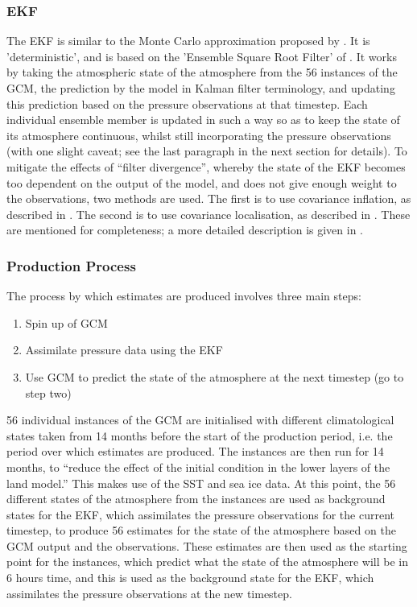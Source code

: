 \documentclass[pdftex,12pt,a4paper]{report}
\begin{document}
\subsubsection{EKF}
The EKF is similar to the Monte Carlo approximation proposed by \textcite{evensen1994sequential,
evensen2003ensemble}. It is 'deterministic', and is based on the 'Ensemble Square Root Filter' of
\textcite{whitaker2002ensemble}. It works by taking the atmospheric state of the atmosphere from the
56 instances of the GCM, the prediction by the model in Kalman filter terminology, and updating this
prediction based on the pressure observations at that timestep. Each individual ensemble member is
updated in such a way so as to keep the state of its atmosphere continuous, whilst still
incorporating the pressure observations (with one slight caveat; see the last paragraph in the next
section for details). To mitigate the effects of ``filter divergence'', whereby the state of the EKF
becomes too dependent on the output of the model, and does not give enough weight to the
observations, two methods are used. The first is to use covariance inflation, as described in
\textcite{whitaker2004reanalysis}. The second is to use covariance localisation, as described in
\textcite{houtekamer2001sequential}. These are mentioned for completeness; a more detailed
description is given in \textcite{compoTwentieth2011}.


\subsubsection{Production Process}
The process by which estimates are produced involves three main steps:

\begin{enumerate}
    \item Spin up of GCM
    \item Assimilate pressure data using the EKF
    \item Use GCM to predict the state of the atmosphere at the next timestep (go to step two)
\end{enumerate}

56 individual instances of the GCM are initialised with different climatological states taken from
14 months before the start of the production period, i.e. the period over which estimates are
produced. The instances are then run for 14 months, to ``reduce the effect of the initial condition
in the lower layers of the land model.'' This makes use of the SST and sea ice data. At this point,
the 56 different states of the atmosphere from the instances are used as background states for the
EKF, which assimilates the pressure observations for the current timestep, to produce 56 estimates
for the state of the atmosphere based on the GCM output and the observations. These estimates are
then used as the starting point for the instances, which predict what the state of the atmosphere
will be in 6 hours time, and this is used as the background state for the EKF, which assimilates the
pressure observations at the new timestep.
\end{document}
